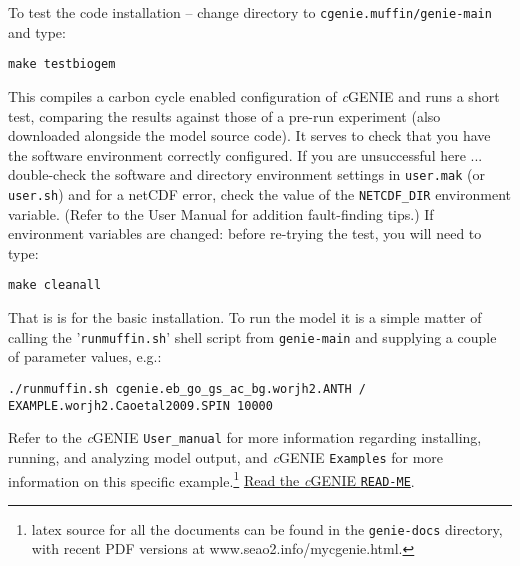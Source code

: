 \documentclass[10pt,twoside]{article}
\begin{document}
\begin{compactenum}
\item   To test the code installation -- change directory to \texttt{cgenie.muffin/genie-main} and type:
\vspace{-5pt}\begin{verbatim}
make testbiogem
\end{verbatim}\vspace{-5pt}
This compiles a carbon cycle enabled configuration of \textit{c}GENIE and runs a short test, comparing the results against those of a pre-run experiment (also downloaded alongside the model source code). It serves to check that you have the software environment correctly configured. If you are unsuccessful here ... double-check the software and directory environment settings in \texttt{user.mak} (or \texttt{user.sh}) and for a netCDF error, check the value of the \texttt{NETCDF\_DIR} environment variable. (Refer to the User Manual for addition fault-finding tips.) If environment variables are changed: before re-trying the test, you will need to type:
\vspace{-5pt}\begin{verbatim}
make cleanall
\end{verbatim}\vspace{-5pt}

\end{compactenum}

\noindent That is is for the basic installation. To run the model it is a simple matter of calling the  '\texttt{runmuffin.sh}'  shell script from \texttt{genie-main} and supplying a couple of parameter values, e.g.:
\vspace{-5pt}\small\begin{verbatim}./runmuffin.sh cgenie.eb_go_gs_ac_bg.worjh2.ANTH / EXAMPLE.worjh2.Caoetal2009.SPIN 10000\end{verbatim}\normalsize\vspace{-5pt}
Refer to the \textit{c}GENIE \texttt{User\_manual} for more information regarding installing, running, and analyzing model output, and \textit{c}GENIE \texttt{Examples} for more information on this specific example.\footnote{latex source for all the documents can be found in the \texttt{genie-docs} directory, with recent PDF versions at www.seao2.info/mycgenie.html.} \uline{Read the \textit{c}GENIE \texttt{READ-ME}}.

\end{document}
